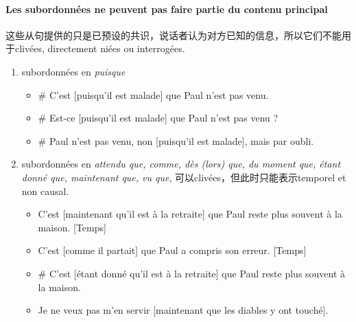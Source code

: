 \documentclass[UTF8]{report}
\begin{document}
\paragraph{Les subordonnées ne peuvent pas faire partie du contenu principal}
这些从句提供的只是已预设的共识，说话者认为对方已知的信息，所以它们不能用于clivées, directement niées ou interrogées.
\begin{enumerate}
    \item subordonnées en \textit{puisque}
    \begin{itemize}
        \item \# C’est [puisqu’il est malade] que Paul n’est pas venu.
        \item \# Est-ce [puisqu’il est malade] que Paul n’est pas venu ?
        \item \# Paul n’est pas venu, non [puisqu’il est malade], mais par oubli.
    \end{itemize}
    \item subordonnées en \textit{attendu que, comme, dès (lors) que, du moment que, étant donné que, maintenant que, vu que}, 可以clivées，但此时只能表示temporel et non causal.
    \begin{itemize}
        \item C’est [maintenant qu’il est à la retraite] que Paul reste plus souvent à la maison. [Temps]
        \item C’est [comme il partait] que Paul a compris son erreur. [Temps]
        \item \# C’est [étant donné qu’il est à la retraite] que Paul reste plus souvent à la maison.
        \item Je ne veux pas m’en servir [maintenant que les diables y ont touché]. 
    \end{itemize}
\end{enumerate}
\end{document}
